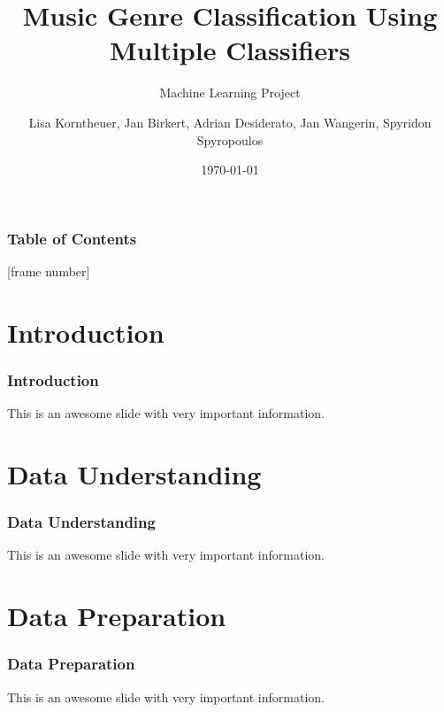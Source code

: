 \documentclass[10pt, aspectratio=169]{beamer}
\title{Music Genre Classification Using Multiple Classifiers}
\subtitle{Machine Learning Project}
\author{Lisa Korntheuer, Jan Birkert, Adrian Desiderato, Jan Wangerin, Spyridon Spyropoulos}
\institute{Technische Hochschule Ulm}
\date{\today}
\begin{document}
\newcommand{\subtext}[1]{$_{\text{#1}}$}

\begin{frame}
    \maketitle
\end{frame}
\begin{frame}[noframenumbering]
    \frametitle{Table of Contents}
    \tableofcontents
\end{frame}
\AtBeginSection[]{
        }
        [frame number]
\section{Introduction}
\begin{frame}
    \frametitle{Introduction}
    \begin{outline}
        \1 This is an awesome slide with very important information. 
    \end{outline}
\end{frame}

\section{Data Understanding}
\begin{frame}
    \frametitle{Data Understanding}
    \begin{outline}
        \1 This is an awesome slide with very important information. 
    \end{outline}

\end{frame}
\section{Data Preparation}
\begin{frame}
    \frametitle{Data Preparation}
    \begin{outline}
        \1 This is an awesome slide with very important information. 
    \end{outline}
\end{frame}
\end{document}
